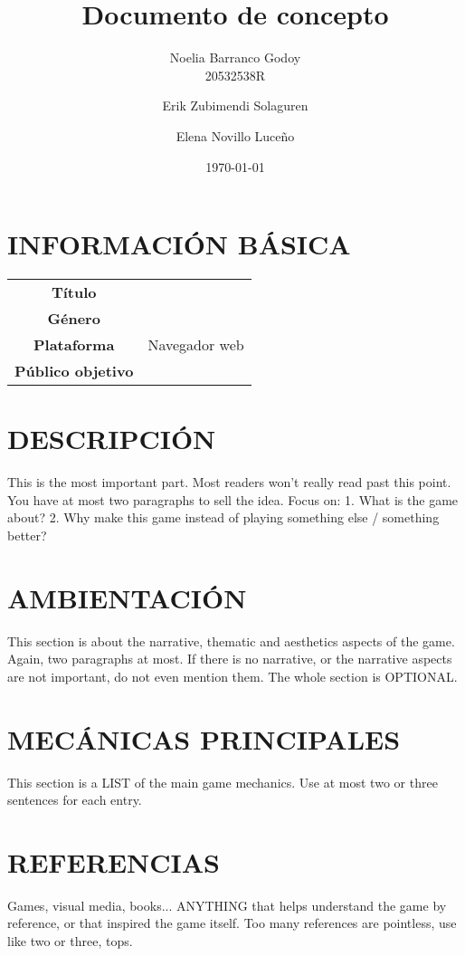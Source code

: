 \documentclass{article}
\title{Documento de concepto} %
\author{Noelia Barranco Godoy \\ 20532538R
\and Erik Zubimendi Solaguren \and Elena Novillo Luceño} %
\date{\today} %
\begin{document}
    \maketitle %
    
    \section{INFORMACIÓN BÁSICA}
    
    \begin{tabular}{||c|c||}
        \hline
        \textbf{Título} & \\
        \textbf{Género} & \\
        \textbf{Plataforma} & Navegador web\\
        \textbf{Público objetivo} & \\
        \hline
    \end{tabular}

    \section{DESCRIPCIÓN}
    This is the most important part. Most readers won’t really read past this point. You have at most two paragraphs to sell the idea. Focus on:
    1. What is the game about?
    2. Why make this game instead of playing something else / something better?

    \section{AMBIENTACIÓN}
    This section is about the narrative, thematic and aesthetics aspects of the game. 
    Again, two paragraphs at most. If there is no narrative, or the narrative aspects are not important, do not even mention them. 
    The whole section is OPTIONAL.

    \section{MECÁNICAS PRINCIPALES}
    This section is a LIST of the main game mechanics. Use at most two or three sentences for each entry.

    \section{REFERENCIAS}
    Games, visual media, books... 
    ANYTHING that helps understand the game by reference,
    or that inspired the game itself. Too many references are pointless,
    use like two or three, tops.
\end{document}
